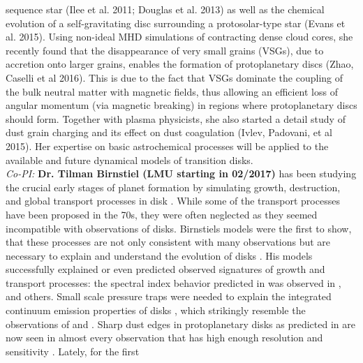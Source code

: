 \documentclass[12pt]{article}
\begin{document}
sequence star (Ilee et al. 2011; Douglas et al. 2013) as well as the
chemical evolution of a self-gravitating disc surrounding a
protosolar-type star (Evans et al. 2015). 
Using non-ideal MHD simulations of contracting dense cloud cores, she recently found that the disappearance of very small grains (VSGs), due to accretion onto larger grains, enables the formation of protoplanetary discs (Zhao, Caselli et al 2016). This is due to the fact that VSGs dominate the coupling of the bulk neutral matter with magnetic fields, thus allowing an efficient loss of angular momentum (via magnetic breaking) in regions where protoplanetary discs should form. Together with plasma physicists, she also started a detail study of dust grain charging and its effect on dust coagulation (Ivlev, Padovani, et al 2015).
Her expertise on basic astrochemical
processes will be applied to the available and future dynamical models
of transition disks. \\
\textit{Co-PI:} \textbf{Dr. Tilman Birnstiel (LMU starting in 02/2017)} has been
studying the crucial early stages of planet formation by simulating growth,
destruction, and global transport processes in disk
\citep[e.g.][]{2010A&A...513A..79B}. While some of the transport processes have
been proposed in the 70s, they were often neglected as they seemed incompatible
with observations of disks. Birnstiels models were the first to show, that these
processes are not only consistent with many observations but are necessary to
explain and understand the evolution of disks \citep{2010A&A...516L..14B}. His
models successfully explained or even predicted observed signatures of growth
and transport processes: the spectral index behavior predicted in
\citet{2010A&A...516L..14B} was observed in \citet{2012ApJ...760L..17P},
\citet{2016A&A...588A..53T} and others. Small scale pressure traps were needed
to explain the integrated continuum emission properties of disks
\citep{2012A&A...538A.114P}, which strikingly resemble the observations of
\citet{2015ApJ...808L...3A} and \citet{2016ApJ...820L..40A}. Sharp dust edges in
protoplanetary disks as predicted in \citet{2014ApJ...780..153B} are now seen in
almost every observation that has high enough resolution and sensitivity
\citep[e.g.][]{2016ApJ...820L..40A,2013A&A...557A.133D}. Lately, for the first
\end{document}
